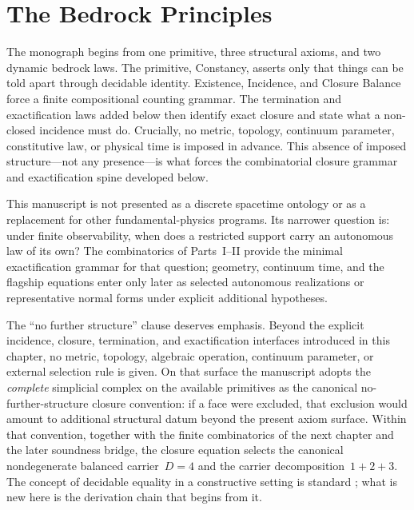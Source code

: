 \section{The Bedrock Principles}
\label{sec:diophantine}

The monograph begins from one primitive, three structural axioms, and two
dynamic bedrock laws. The primitive, Constancy, asserts only that things can
be told apart through decidable identity. Existence, Incidence, and Closure
Balance force a finite compositional counting grammar. The termination and
exactification laws added below then identify exact closure and state what a
non-closed incidence must do. Crucially, no
metric, topology, continuum parameter, constitutive law, or physical time is
imposed in advance. This absence of imposed structure---not any
presence---is what forces the combinatorial closure grammar and exactification
spine developed below.

This manuscript is not presented as a discrete spacetime ontology or as a
replacement for other fundamental-physics programs. Its narrower question is:
under finite observability, when does a restricted support carry an autonomous
law of its own? The combinatorics of Parts~I--II provide the minimal
exactification grammar for that question; geometry, continuum time, and the
flagship equations enter only later as selected autonomous realizations or
representative normal forms under explicit additional hypotheses.

The ``no further structure'' clause deserves emphasis. Beyond the explicit
incidence, closure, termination, and exactification interfaces introduced in
this chapter, no metric, topology, algebraic operation, continuum parameter,
or external selection rule is given. On that surface the manuscript adopts the
\emph{complete} simplicial complex on the available primitives as the
canonical no-further-structure closure convention: if a face were excluded,
that exclusion would amount to additional structural datum beyond the present
axiom surface. Within that convention, together with the finite combinatorics
of the next chapter and the later soundness bridge, the closure equation
selects the canonical nondegenerate balanced carrier~$D=4$ and the carrier
decomposition~$1{+}2{+}3$. The
concept of decidable equality in a constructive setting is standard
\cite{Bishop1967,MartinLof1984,deMouraKongAvigadEtAl2015}; what is new here is
the derivation chain that begins from it.

